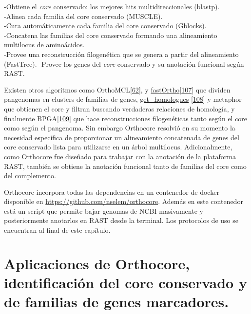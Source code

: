 \documentclass[12pt,twoside]{reedthesis}
\begin{document}
  -Obtiene el \emph{core} conservado: los mejores hits multidireccionales
  (blastp).\\
  -Alinea cada familia del core conservado (MUSCLE).\\
  -Cura automáticamente cada familia del core conservado (Gblocks).\\
  -Concatena las familias del core conservado formando una alineamiento
  multilocus de aminoácidos.\\
  -Provee una reconstrucción filogenética que se genera a partir del
  alineamiento (FastTree). -Provee los genes del \emph{core} conservado y
  su anotación funcional según RAST.
  
  Existen otros algoritmos como
  OrthoMCL{[}\protect\hyperlink{ref-li_orthomcl_2003}{62}{]}, y
  \href{https://github.com/grovesdixon/using_FastOrtho}{fastOrtho}{[}\protect\hyperlink{ref-wattam_patric_2014}{107}{]}
  que dividen pangenomas en clusters de familias de genes,
  \href{http://eead-csic-compbio.github.io/get_homologues/manual/}{get\_homologues}
  {[}\protect\hyperlink{ref-contreras-moreira_get_homologues_2013}{108}{]}
  y metaphor que obtienen el core y filtran buscando verdaderas relaciones
  de homología, y finalmente
  BPGA{[}\protect\hyperlink{ref-chaudhari_bpga-_2016}{109}{]} que hace
  reconstrucciones filogenéticas tanto según el core como según el
  pangenoma. Sin embargo Orthocore resolvió en su momento la necesidad
  específica de proporcionar un alineamiento concatenada de genes del core
  conservado lista para utilizarse en un árbol multilocus. Adicionalmente,
  como Orthocore fue diseñado para trabajar con la anotación de la
  plataforma RAST, también se obtiene la anotación funcional tanto de
  familias del core como del complemento.
  
  Orthocore incorpora todas las dependencias en un contenedor de docker
  disponible en \url{https://github.com/nselem/orthocore}. Además en este
  contenedor está un script que permite bajar genomas de NCBI masivamente
  y posteriormente anotarlos en RAST desde la terminal. Los protocolos de
  uso se encuentran al final de este capítulo.
  
  \section{Aplicaciones de Orthocore, identificación del core conservado y
  de familias de genes
  marcadores.}\label{aplicaciones-de-orthocore-identificacion-del-core-conservado-y-de-familias-de-genes-marcadores.}
  
\end{document}
